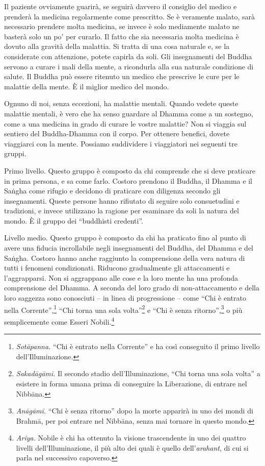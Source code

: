 Il paziente ovviamente guarirà, se seguirà davvero il consiglio del
medico e prenderà la medicina regolarmente come prescritto. Se è
veramente malato, sarà necessario prendere molta medicina, se invece è
solo mediamente malato ne basterà solo un po' per curarlo. Il fatto che
sia necessaria molta medicina è dovuto alla gravità della malattia. Si
tratta di una cosa naturale e, se la considerate con attenzione, potete
capirla da soli. Gli insegnamenti del Buddha servono a curare i mali
della mente, a ricondurla alla sua naturale condizione di salute. Il
Buddha può essere ritenuto un medico che prescrive le cure per le
malattie della mente. È il miglior medico del mondo.

Ognuno di noi, senza eccezioni, ha malattie mentali. Quando vedete
queste malattie mentali, è vero che ha senso guardare al Dhamma come a
un sostegno, come a una medicina in grado di curare le vostre malattie?
Non si viaggia sul sentiero del Buddha-Dhamma con il corpo. Per ottenere
benefici, dovete viaggiarci con la mente. Possiamo suddividere i
viaggiatori nei seguenti tre gruppi.

Primo livello. Questo gruppo è composto da chi comprende che si deve
praticare in prima persona, e sa come farlo. Costoro prendono il Buddha,
il Dhamma e il Saṅgha come rifugio e decidono di praticare con diligenza
secondo gli insegnamenti. Queste persone hanno rifiutato di seguire solo
consuetudini e tradizioni, e invece utilizzano la ragione per esaminare
da soli la natura del mondo. È il gruppo dei ``buddhisti credenti''.

Livello medio. Questo gruppo è composto da chi ha praticato fino al
punto di avere una fiducia incrollabile negli insegnamenti del Buddha,
del Dhamma e del Saṅgha. Costoro hanno anche raggiunto la comprensione
della vera natura di tutti i fenomeni condizionati. Riducono
gradualmente gli attaccamenti e l'aggrapparsi. Non si aggrappano alle
cose e la loro mente ha una profonda comprensione del Dhamma. A seconda
del loro grado di non-attaccamento e della loro saggezza sono conosciuti
-- in linea di progressione -- come ``Chi è entrato nella
Corrente'',\footnote{\emph{Sotāpanna.} ``Chi è entrato nella Corrente''
  e ha così conseguito il primo livello dell'Illuminazione.} ``Chi torna
una sola volta''\footnote{\emph{Sakadāgāmī.} Il secondo stadio
  dell'Illuminazione, ``Chi torna una sola volta'' a esistere in forma
  umana prima di conseguire la Liberazione, di entrare nel
  Nibbāna.} e ``Chi è senza ritorno'',\footnote{\emph{Anāgāmī.}
  ``Chi è senza ritorno'' dopo la morte apparirà in uno dei mondi di
  Brahmā, per poi entrare nel Nibbāna, senza mai tornare in
  questo mondo.} o più semplicemente come Esseri Nobili.\footnote{\emph{Ariya.}
  Nobile è chi ha ottenuto la visione trascendente in uno dei quattro
  livelli dell'Illuminazione, il più alto dei quali è quello
  dell'\emph{arahant}, di cui si parla nel successivo capoverso.}

